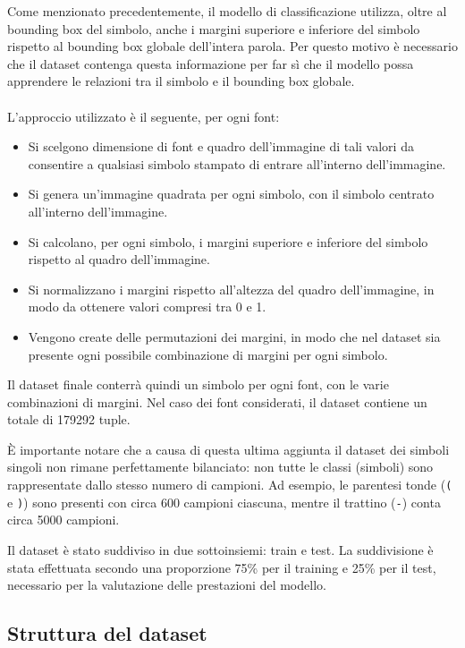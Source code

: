 Come menzionato precedentemente, il modello di classificazione utilizza, oltre al bounding box del simbolo, anche i margini superiore e inferiore del simbolo rispetto al bounding box globale dell'intera parola. Per questo motivo è necessario che il dataset contenga questa informazione per far sì che il modello possa apprendere le relazioni tra il simbolo e il bounding box globale.
\\ \\
L'approccio utilizzato è il seguente, per ogni font:
\begin{itemize}
	\item Si scelgono dimensione di font e quadro dell'immagine di tali valori da consentire a qualsiasi simbolo stampato di entrare all'interno dell'immagine.
	\item Si genera un'immagine quadrata per ogni simbolo, con il simbolo centrato all'interno dell'immagine.
	\item Si calcolano, per ogni simbolo, i margini superiore e inferiore del simbolo rispetto al quadro dell'immagine.
	\item Si normalizzano i margini rispetto all'altezza del quadro dell'immagine, in modo da ottenere valori compresi tra 0 e 1.
	\item Vengono create delle permutazioni dei margini, in modo che nel dataset sia presente ogni possibile combinazione di margini per ogni simbolo.
\end{itemize}

Il dataset finale conterrà quindi un simbolo per ogni font, con le varie combinazioni di margini.  Nel caso dei font considerati, il dataset contiene un totale di 179292 tuple.

È importante notare che a causa di questa ultima aggiunta il dataset dei simboli singoli non rimane perfettamente bilanciato: non tutte le classi (simboli) sono rappresentate dallo stesso numero di campioni. Ad esempio, le parentesi tonde (\texttt{(} e \texttt{)}) sono presenti con circa 600 campioni ciascuna, mentre il trattino (\texttt{-}) conta circa 5000 campioni.

Il dataset è stato suddiviso in due sottoinsiemi: train e test. La suddivisione è stata effettuata secondo una proporzione 75\% per il training e 25\% per il test, necessario per la valutazione delle prestazioni del modello.

\subsection{Struttura del dataset}

